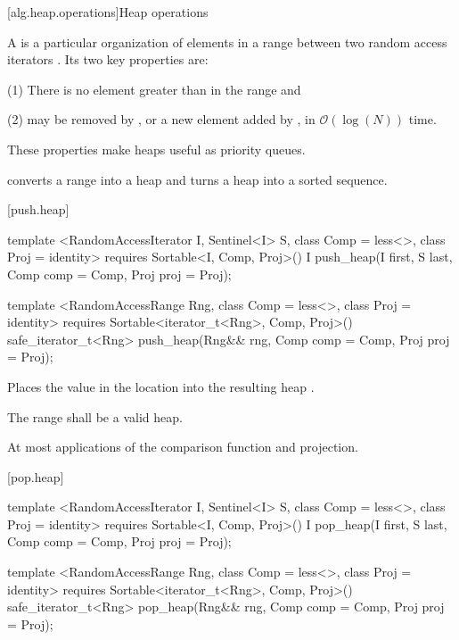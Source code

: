 [alg.heap.operations]{Heap operations}

\pnum
A
is a particular organization of elements in a range between two random access iterators
.
Its two key properties are:

\begin{description}
\item{(1)} There is no element greater than
in the range and
\item{(2)} 
may be removed by
,
or a new element added by
,
in
$\mathcal{O}(\log(N))$
time.
\end{description}

\pnum
These properties make heaps useful as priority queues.

\pnum
{}
converts a range into a heap and
turns a heap into a sorted sequence.

[push.heap]{}

%
\begin{itemdecl}
template <RandomAccessIterator I, Sentinel<I> S, class Comp = less<>,
    class Proj = identity>
  requires Sortable<I, Comp, Proj>()
  I push_heap(I first, S last, Comp comp = Comp{}, Proj proj = Proj{});

template <RandomAccessRange Rng, class Comp = less<>, class Proj = identity>
  requires Sortable<iterator_t<Rng>, Comp, Proj>()
  safe_iterator_t<Rng>
    push_heap(Rng&& rng, Comp comp = Comp{}, Proj proj = Proj{});
\end{itemdecl}

\begin{itemdescr}
\pnum
\effects
Places the value in the location
into the resulting heap
.

\pnum
\requires
The range
shall be a valid heap.

\pnum
\returns {}

\pnum
\complexity
At most
applications of the comparison function and projection.
\end{itemdescr}

[pop.heap]{}

%
\begin{itemdecl}
template <RandomAccessIterator I, Sentinel<I> S, class Comp = less<>,
    class Proj = identity>
  requires Sortable<I, Comp, Proj>()
  I pop_heap(I first, S last, Comp comp = Comp{}, Proj proj = Proj{});

template <RandomAccessRange Rng, class Comp = less<>, class Proj = identity>
  requires Sortable<iterator_t<Rng>, Comp, Proj>()
  safe_iterator_t<Rng>
    pop_heap(Rng&& rng, Comp comp = Comp{}, Proj proj = Proj{});
\end{itemdecl}

